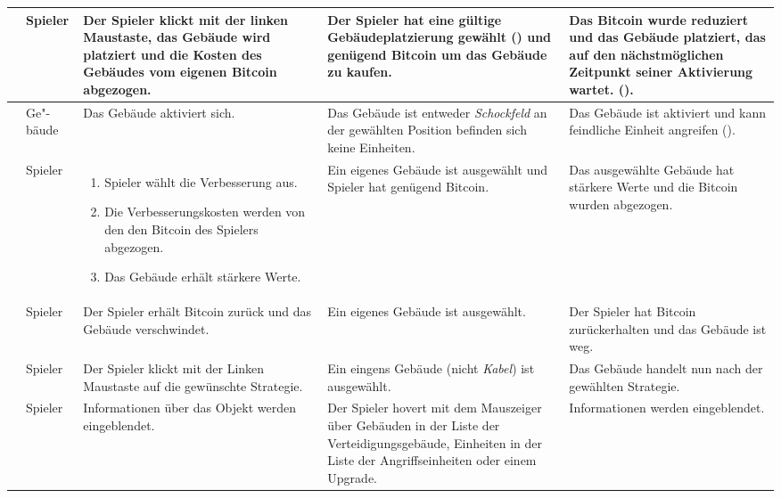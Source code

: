 \begin{longtabu}{X[0.6L]X[0.4L]X[L]X[L]X[L]}
    & Spieler
    & Der Spieler klickt mit der linken Maustaste, das Gebäude wird platziert
      und die Kosten des Gebäudes vom eigenen Bitcoin abgezogen.
    & Der Spieler hat eine gültige Gebäudeplatzierung gewählt
      () und genügend Bitcoin um das Gebäude zu kaufen.
    & Das Bitcoin wurde reduziert und das Gebäude platziert, das auf den
      nächstmöglichen Zeitpunkt seiner Aktivierung wartet.
      ().
    \\\midrule

    & Ge"-bäude
    & Das Gebäude aktiviert sich.
    & Das Gebäude ist entweder \emph{Schockfeld} \textbf{} an der
      gewählten Position befinden sich keine Einheiten.
    & Das Gebäude ist aktiviert und kann feindliche Einheit angreifen
      ().
  \\\midrule

    & Spieler
    & \vspace*{-0.2cm}\begin{enumerate}[nosep, leftmargin=*]
        \item Spieler wählt die Verbesserung aus.
        \item Die Verbesserungskosten werden von den den Bitcoin des Spielers
          abgezogen.
        \item Das Gebäude erhält stärkere Werte.
      \end{enumerate}
    & Ein eigenes Gebäude ist ausgewählt und Spieler hat genügend Bitcoin.
    & Das ausgewählte Gebäude hat stärkere Werte und die Bitcoin wurden abgezogen.
  \\\midrule

    & Spieler
    & Der Spieler erhält Bitcoin zurück und das Gebäude verschwindet.
    & Ein eigenes Gebäude ist ausgewählt.
    & Der Spieler hat Bitcoin zurückerhalten und das Gebäude ist weg.
  \\\midrule

    & Spieler
    & Der Spieler klickt mit der Linken Maustaste auf die gewünschte Strategie.
    & Ein eingens Gebäude (nicht \emph{Kabel}) ist ausgewählt.
    & Das Gebäude handelt nun nach der gewählten Strategie.
  \\\midrule

    & Spieler
    & Informationen über das Objekt werden eingeblendet.
    & Der Spieler hovert mit dem Mauszeiger über Gebäuden in der Liste der
      Verteidigungsgebäude, Einheiten in der Liste der Angriffseinheiten oder
      einem Upgrade.
    & Informationen werden eingeblendet.

  \\\bottomrule
\end{longtabu}
\endgroup
